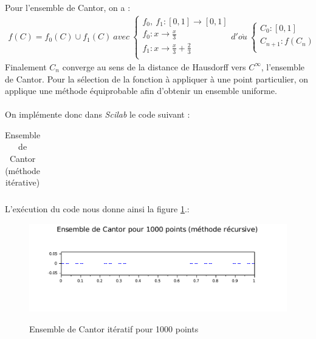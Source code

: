 \documentclass[a4paper,10pt]{report}
\begin{document}
Pour l'ensemble de Cantor, on a :\\
\begin{equation}
\begin{array}{l}
f(C)=f_0(C)\cup f_1(C) \ avec \
\left\lbrace
\begin{array}{l}
f_0,\ f_1 : [0,1] \longrightarrow [0,1] \\
f_0 : x \longrightarrow \frac{x}{3}\\
f_1 : x \longrightarrow \frac{x}{3}+\frac{2}{3}\\
\end{array}\right.
d'o\grave{u} \
\left\lbrace
\begin{array}{l}
C_0 : [0,1]\\
C_{n+1} : f(C_n)\\
\end{array}\right.
\end{array}
\end{equation}
Finalement $C_n$ converge au sens de la distance de Hausdorff vers $C^\infty$, l'ensemble de Cantor. Pour la sélection de la fonction à appliquer à une point particulier, on applique une méthode équiprobable afin d'obtenir un ensemble uniforme.\\ \\
\indent On implémente donc dans \textit{Scilab} le code suivant :
\begin{table}[H]
\caption{Ensemble de Cantor (méthode itérative)}
\begin{tabular}{l}
\\
\end{tabular}
\end{table}
L'exécution du code nous donne ainsi la figure \ref{cantor_iteratif}.:
\begin{center}
\begin{figure}[H]
\caption{Ensemble de Cantor itératif pour 1000 points}
\includegraphics[width=\textwidth]{cantor_iteratif.pdf}
\label{cantor_iteratif}
\end{figure}
\end{center}
\end{document}
